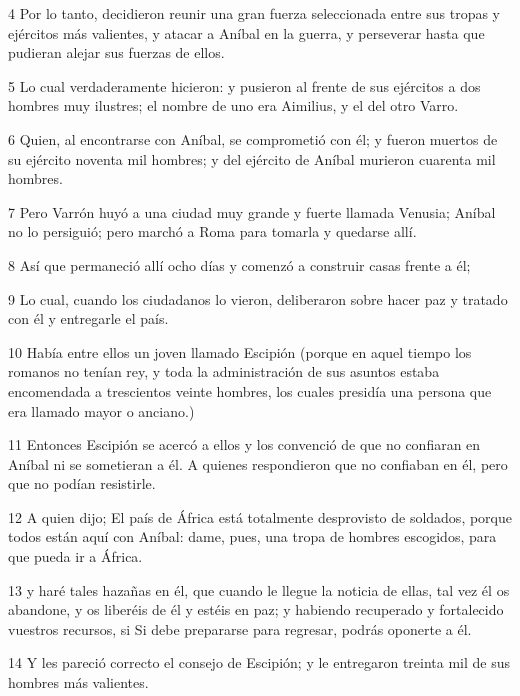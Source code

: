 \par 4 Por lo tanto, decidieron reunir una gran fuerza seleccionada entre sus tropas y ejércitos más valientes, y atacar a Aníbal en la guerra, y perseverar hasta que pudieran alejar sus fuerzas de ellos.

\par 5 Lo cual verdaderamente hicieron: y pusieron al frente de sus ejércitos a dos hombres muy ilustres; el nombre de uno era Aimilius, y el del otro Varro.

\par 6 Quien, al encontrarse con Aníbal, se comprometió con él; y fueron muertos de su ejército noventa mil hombres; y del ejército de Aníbal murieron cuarenta mil hombres.

\par 7 Pero Varrón huyó a una ciudad muy grande y fuerte llamada Venusia; Aníbal no lo persiguió; pero marchó a Roma para tomarla y quedarse allí.

\par 8 Así que permaneció allí ocho días y comenzó a construir casas frente a él;

\par 9 Lo cual, cuando los ciudadanos lo vieron, deliberaron sobre hacer paz y tratado con él y entregarle el país.

\par 10 Había entre ellos un joven llamado Escipión (porque en aquel tiempo los romanos no tenían rey, y toda la administración de sus asuntos estaba encomendada a trescientos veinte hombres, los cuales presidía una persona que era llamado mayor o anciano.)

\par 11 Entonces Escipión se acercó a ellos y los convenció de que no confiaran en Aníbal ni se sometieran a él. A quienes respondieron que no confiaban en él, pero que no podían resistirle.

\par 12 A quien dijo; El país de África está totalmente desprovisto de soldados, porque todos están aquí con Aníbal: dame, pues, una tropa de hombres escogidos, para que pueda ir a África.

\par 13 y haré tales hazañas en él, que cuando le llegue la noticia de ellas, tal vez él os abandone, y os liberéis de él y estéis en paz; y habiendo recuperado y fortalecido vuestros recursos, si Si debe prepararse para regresar, podrás oponerte a él.

\par 14 Y les pareció correcto el consejo de Escipión; y le entregaron treinta mil de sus hombres más valientes.

